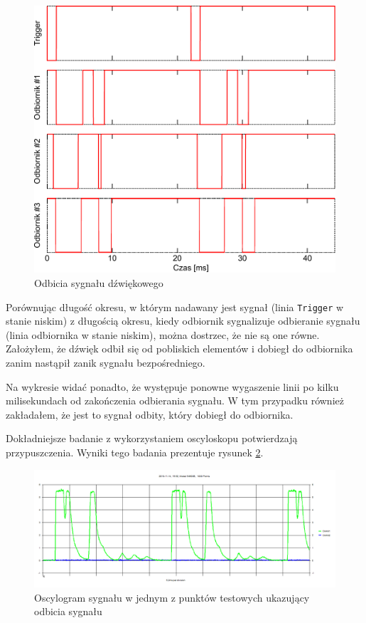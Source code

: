 \begin{figure}
 \includegraphics[width=\textwidth]{gfx/odbicia.pdf}
 \caption{Odbicia sygnału dźwiękowego}
 \label{fig:logic_analyzer}
\end{figure}

Porównując długość okresu, w którym nadawany jest sygnał (linia \texttt{Trigger} w stanie niskim) z długością okresu, kiedy odbiornik sygnalizuje odbieranie sygnału (linia odbiornika w stanie niskim), można dostrzec, że nie są one równe. Założyłem, że dźwięk odbił się od pobliskich elementów i dobiegł do odbiornika zanim nastąpił zanik sygnału bezpośredniego.

Na wykresie widać ponadto, że występuje ponowne wygaszenie linii po kilku milisekundach od zakończenia odbierania sygnału. W tym przypadku również zakładałem, że jest to sygnał odbity, który dobiegł do odbiornika.

Dokładniejsze badanie z wykorzystaniem oscyloskopu potwierdzają przypuszczenia. Wyniki tego badania prezentuje rysunek \ref{fig:oscilloscope}.

\begin{figure}
 \includegraphics[width=\textwidth]{gfx/oscyloskop_1.png}
 \caption[Oscylogram sygnału w punkcie testowym]{Oscylogram sygnału w jednym z punktów testowych ukazujący odbicia sygnału}
 \label{fig:oscilloscope}
\end{figure}

